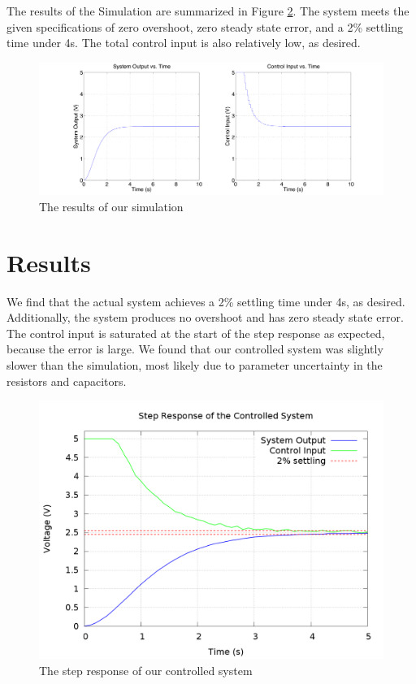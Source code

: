 \documentclass[11pt]{article}
\begin{document}
The results of the Simulation are summarized in Figure \ref{fig:results}.
The system meets the given specifications of zero overshoot, zero steady state error, and a 2\% settling time under 4s.
The total control input is also relatively low, as desired.

\begin{figure}[h]
\centering
\includegraphics[width = 0.75\linewidth]{sim_results}
\caption{The results of our simulation}\label{fig:results}
\end{figure}

\section*{Results}

We find that the actual system achieves a 2\% settling time under 4s, as desired.
Additionally, the system produces no overshoot and has zero steady state error.
The control input is saturated at the start of the step response as expected, because the error is large.
We found that our controlled system was slightly slower than the simulation, most likely due to parameter uncertainty in the resistors and capacitors. 

\begin{figure}[h]
\centering
\includegraphics[width = 0.8\linewidth]{results}
\caption{The step response of our controlled system}\label{fig:results}
\end{figure}
\end{document}
